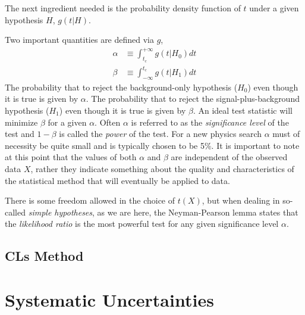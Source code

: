 The next ingredient needed is the probability density function of $t$ under a given hypothesis $H$, $g(t|H)$.

Two important quantities are defined via $g$,
\begin{align}
    \alpha &\equiv \int_{t_c}^{+ \infty} g(t|H_0)dt \\
    \beta &\equiv \int_{-\infty}^{t_c} g(t|H_1)dt
\end{align}
The probability that to reject the background-only hypothesis ($H_0$) even though it is true is given by $\alpha$.
The probability that to reject the signal-plus-background hypothesis ($H_1$) even though it is true is given by $\beta$.
An ideal test statistic will minimize $\beta$ for a given $\alpha$.
Often $\alpha$ is referred to as the \textit{significance level} of the test and $1-\beta$ is called the \textit{power} of the test.
For a new physics search $\alpha$ must of necessity be quite small and is typically chosen to be 5\%.
It is important to note at this point that the values of both $\alpha$ and $\beta$ are independent of the observed data $X$, rather they indicate something about the quality and characteristics of the statistical method that will eventually be applied to data.

There is some freedom allowed in the choice of $t(X)$, but when dealing in so-called \textit{simple hypotheses}, as we are here, the Neyman-Pearson lemma states that the \textit{likelihood ratio} is the most powerful test for any given significance level $\alpha$.

\subsection{CLs Method}


\section{Systematic Uncertainties}
